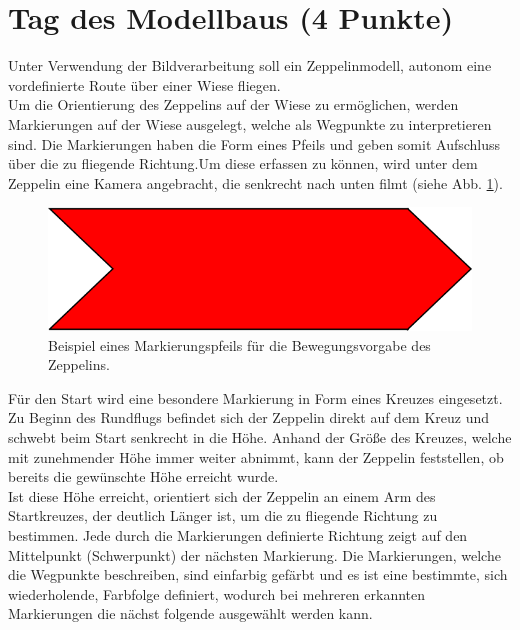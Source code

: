 \documentclass{ezb}
\begin{document}
\section{Tag des Modellbaus (4 Punkte)}
Unter Verwendung der Bildverarbeitung soll ein Zeppelinmodell, autonom eine vordefinierte Route über einer Wiese fliegen.\\
\linebreak
Um die Orientierung des Zeppelins auf der Wiese zu ermöglichen, werden Markierungen auf der Wiese ausgelegt, welche als Wegpunkte zu interpretieren sind. Die Markierungen haben die Form eines Pfeils und geben somit Aufschluss über die zu fliegende Richtung.Um diese erfassen zu können, wird unter dem Zeppelin eine Kamera angebracht, die senkrecht nach unten filmt (siehe Abb. \ref{fig1}).\\ 
\begin{figure}[h]
	\centering
  \includegraphics{richtungspfeil.png}
	\caption{Beispiel eines Markierungspfeils für die Bewegungsvorgabe des Zeppelins.}
	\label{fig1}
\end{figure}
\linebreak
Für den Start wird eine besondere Markierung in Form eines Kreuzes eingesetzt. Zu Beginn des Rundflugs befindet sich der Zeppelin direkt auf dem Kreuz und schwebt beim Start senkrecht in die Höhe. Anhand der Größe des Kreuzes, welche mit zunehmender Höhe immer weiter abnimmt, kann der Zeppelin feststellen, ob bereits die gewünschte Höhe erreicht wurde.\\ 
\linebreak
Ist diese Höhe erreicht, orientiert sich der Zeppelin an einem Arm des Startkreuzes, der deutlich Länger ist, um die zu fliegende Richtung zu bestimmen. Jede durch die Markierungen definierte Richtung zeigt auf den Mittelpunkt (Schwerpunkt) der nächsten Markierung. Die Markierungen, welche die Wegpunkte beschreiben, sind einfarbig gefärbt und es ist eine bestimmte, sich wiederholende, Farbfolge definiert, wodurch bei mehreren erkannten Markierungen die nächst folgende ausgewählt werden kann.\\ 
\linebreak
\end{document}
